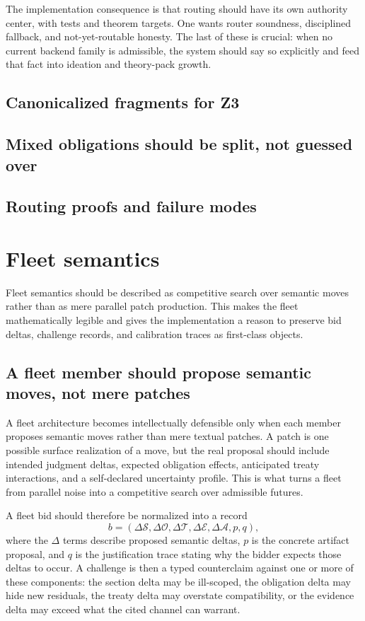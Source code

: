 \documentclass[11pt]{report}
\begin{document}
The implementation consequence is that routing should have its own authority center, with tests and theorem targets. One wants router soundness, disciplined fallback, and not-yet-routable honesty. The last of these is crucial: when no current backend family is admissible, the system should say so explicitly and feed that fact into ideation and theory-pack growth.
\section{Canonicalized fragments for Z3}
\section{Mixed obligations should be split, not guessed over}
\section{Routing proofs and failure modes}
\chapter{Fleet semantics}
\noindent Fleet semantics should be described as competitive search over semantic moves rather than as mere parallel patch production. This makes the fleet mathematically legible and gives the implementation a reason to preserve bid deltas, challenge records, and calibration traces as first-class objects.
\section{A fleet member should propose semantic moves, not mere patches}
 A fleet architecture becomes intellectually defensible only when each member proposes semantic moves rather than mere textual patches. A patch is one possible surface realization of a move, but the real proposal should include intended judgment deltas, expected obligation effects, anticipated treaty interactions, and a self-declared uncertainty profile. This is what turns a fleet from parallel noise into a competitive search over admissible futures.

A fleet bid should therefore be normalized into a record
\[
b = (\Delta \mathcal{S}, \Delta \mathcal{O}, \Delta \mathcal{T}, \Delta \mathcal{E}, \Delta \mathcal{A}, p, q),
\]
where the $\Delta$ terms describe proposed semantic deltas, $p$ is the concrete artifact proposal, and $q$ is the justification trace stating why the bidder expects those deltas to occur. A challenge is then a typed counterclaim against one or more of these components: the section delta may be ill-scoped, the obligation delta may hide new residuals, the treaty delta may overstate compatibility, or the evidence delta may exceed what the cited channel can warrant.
\end{document}
